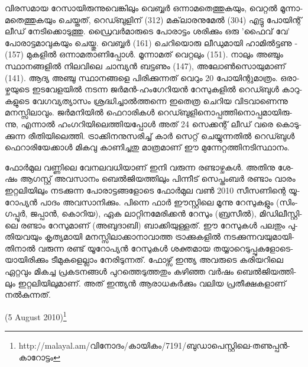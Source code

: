 ­വി­ര­സ­മായ റേ­സാ­യി­രു­ന്നു­വെ­ങ്കി­ലും വെ­ബ്ബര്‍ ഒന്നാ­മ­തെ­ത്തു­ക­യും, വെ­റ്റല്‍ മൂ­ന്നാ­മ­തെ­ത്തു­ക­യും ചെ­യ്ത­ത്, റെ­ഡ്ബു­ളി­ന് 
(312) മക്‌­ലാ­ര­നു­മേല്‍ (304) എട്ടു പോ­യി­ന്റ് ലീ­ഡ് നേ­ടി­ക്കൊ­ടു­ത്തു. ഡ്രൈ­വര്‍­മാ­രു­ടെ പോ­രാ­ട്ടം ശരി­ക്കും ഒരു 'ഫൈ­വ് 
വേ' പോ­രാ­ട്ട­മാ­വു­ക­യും ചെ­യ്തു. വെ­ബ്ബര്‍ (161) ചെ­റി­യൊ­രു ലീ­ഡു­മാ­യി ഹാ­മില്‍­ട്ട­ണു ­(157) മു­ക­ളില്‍ ഒന്നാ­മ­താ­ണി­പ്പോള്‍. 
മൂ­ന്നാ­മ­ത് വെ­റ്റ­ലും ­(151). നാ­ലും അഞ്ചും സ്ഥാ­ന­ങ്ങ­ളില്‍ നി­ല­വി­ലെ ചാ­മ്പ്യന്‍ ബട്ട­ണും ­(147), 
അലോണ്‍­സൊ­യു­മാ­ണ് (141). ആദ്യ അഞ്ചു സ്ഥാ­ന­ങ്ങ­ളെ പി­രി­ക്കു­ന്ന­ത് വെ­റും 20 പോ­യി­ന്റു­മാ­ത്രം. ഒരാ­ഴ്ച­യു­ടെ 
ഇട­വേ­ള­യില്‍ നട­ന്ന ജര്‍­മന്‍-ഹം­ഗേ­റി­യന്‍ റേ­സു­ക­ളില്‍ റെ­ഡ്ബുള്‍ കാ­റു­ക­ളു­ടെ വേ­ഗ­വ്യ­ത്യാ­സം ശ്ര­ദ്ധി­ച്ചാല്‍­ത്ത­ന്നെ 
ഇതെ­ത്ര ചെ­റിയ വി­ട­വാ­ണെ­ന്നു മന­സ്സി­ലാ­വും. ജര്‍­മ­നി­യില്‍ ഫെ­റാ­രി­കള്‍ റെ­ഡ്ബു­ളി­നൊ­പ്പ­ത്തി­നൊ­പ്പ­മാ­യി­രു­ന്നു, 
എന്നാല്‍ ഹം­ഗ­റി­യി­ലെ­ത്തി­യ­പ്പോള്‍ അത് 24 സെ­ക്ക­ന്റ് ലീ­ഡ് വരെ കൊ­ടു­ക്കു­ന്ന രീ­തി­യി­ലെ­ത്തി. ട്രാ­ക്കി­ന­നു­സ­രി­ച്ച് 
കാര്‍ സെ­റ്റ് ചെ­യ്യു­ന്ന­തില്‍ റെ­ഡ്ബുള്‍ ഫെ­റാ­രി­യേ­ക്കാള്‍ മി­ക­വു കാ­ണി­ച്ച­തു മാ­ത്ര­മാ­ണ് ഈ മു­ന്നേ­റ്റ­ത്തി­ന­ടി­സ്ഥാ­നം­.

­ഫോര്‍­മുല വണ്ണി­ലെ വേ­ന­ല­വ­ധി­യാ­ണ് ഇനി വരു­ന്ന രണ്ടാ­ഴ്ച­കള്‍. അതി­നു ശേ­ഷം ആഗ­സ്റ്റ് അവ­സാ­നം 
ബെല്‍­ജി­യ­ത്തി­ലും പി­ന്നീ­ട് സെ­പ്തം­ബര്‍ രണ്ടാം വാ­രം ഇറ്റ­ലി­യി­ലും നട­ക്കു­ന്ന പോ­രാ­ട്ട­ങ്ങ­ളോ­ടെ ­ഫോര്‍­മുല വണ്‍ 2010 
സീ­സ­ണി­ന്റെ ­യൂ­റോ­പ്യന്‍ പാ­ദം­ അവ­സാ­നി­ക്കും. പി­ന്നെ ഫാര്‍ ഈസ്റ്റി­ലെ മൂ­ന്നു റേ­സു­ക­ളും (സിം­ഗ­പ്പൂര്‍, ­ജ­പ്പാന്‍, കൊ­റി­യ),
ഏക ലാ­റ്റി­ന­മേ­രി­ക്കന്‍ റേ­സും (­ബ്ര­സീല്‍), മി­ഡി­ലീ­സ്റ്റി­ലെ രണ്ടാം റേ­സു­മാ­ണ് (അ­ബു­ദാ­ബി­) ബാ­ക്കി­യു­ള്ള­ത്. ഈ 
റേ­സു­കള്‍ പല­തും പു­തി­യ­വ­യും കൃ­ത്യ­മാ­യി മന­സ്സി­ലാ­ക്കാ­നാ­വാ­ത്ത ട്രാ­ക്കു­ക­ളില്‍ നട­ക്കു­ന്ന­വ­യു­മാ­യി­തി­നാല്‍ വരു­ന്ന രണ്ട് 
യൂ­റോ­പ്യന്‍ റേ­സു­കള്‍ ശക്ത­മായ തയ്യാ­റെ­ടു­പ്പു­ക­ളോ­ടെ­യാ­യി­രി­ക്കും ടീ­മു­ക­ളെ­ല്ലാം നേ­രി­ടു­ന്ന­ത്. ­ഫോ­ഴ്സ് ഇന്ത്യ അവ­രു­ടെ 
കരി­യ­റി­ലെ ഏറ്റ­വും മി­ക­ച്ച പ്ര­ക­ട­ന­ങ്ങള്‍ പു­റ­ത്തെ­ടു­ത്ത­തും കഴി­ഞ്ഞ വര്‍­ഷം ബെല്‍­ജി­യ­ത്തി­ലും ഇറ്റ­ലി­യി­ലു­മാ­ണ്. 
അത് ഇന്ത്യന്‍ ആരാ­ധ­കര്‍­ക്കും വലിയ പ്ര­തീ­ക്ഷ­ക­ളാ­ണ് നല്‍­കു­ന്ന­ത്.

(5 August 2010)\footnote{http://malayal.am/വിനോദം/കായികം/7191/ബുഡാപെസ്റ്റിലെ-തണുപ്പന്‍-കാറോട്ടം}

\newpage
